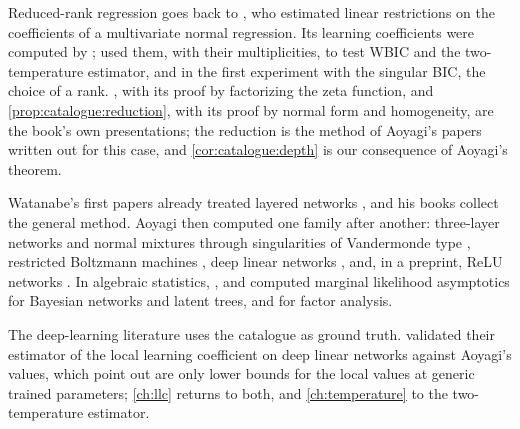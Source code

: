 \begin{refsection}
\notesandrefs
Reduced-rank regression goes back to \textcite{Anderson1951}, who estimated linear restrictions on the coefficients of a multivariate normal regression. Its learning coefficients were computed by \textcite{AoyagiWatanabe2005}; \textcite{Watanabe2013} used them, with their multiplicities, to test WBIC and the two-temperature estimator, and \textcite{DrtonPlummer2017} in the first experiment with the singular BIC, the choice of a rank. , with its proof by factorizing the zeta function, and \cref{prop:catalogue:reduction}, with its proof by normal form and homogeneity, are the book's own presentations; the reduction is the method of Aoyagi's papers written out for this case, and \cref{cor:catalogue:depth} is our consequence of Aoyagi's theorem.

Watanabe's first papers already treated layered networks \parencite{Watanabe2001a}, and his books \parencite{Watanabe2009,Watanabe2018} collect the general method. Aoyagi then computed one family after another: three-layer networks and normal mixtures through singularities of Vandermonde type \parencite{Aoyagi2010a,AoyagiNagata2012,Aoyagi2019}, restricted Boltzmann machines \parencite{Aoyagi2010b}, deep linear networks \parencite{Aoyagi2024}, and, in a preprint, ReLU networks \parencite{Aoyagi2025}. In algebraic statistics, \textcite{RusakovGeiger2005}, \textcite{Zwiernik2011} and \textcite{DrtonEtAl2017} computed marginal likelihood asymptotics for Bayesian networks and latent trees, and \textcite{DrtonEtAl2025} for factor analysis.

The deep-learning literature uses the catalogue as ground truth. \Textcite{LauEtAl2025} validated their estimator of the local learning coefficient on deep linear networks against Aoyagi's values, which \textcite[a preprint]{HitchcockHoogland2025} point out are only lower bounds for the local values at generic trained parameters; \cref{ch:llc} returns to both, and \cref{ch:temperature} to the two-temperature estimator.


\end{refsection}
